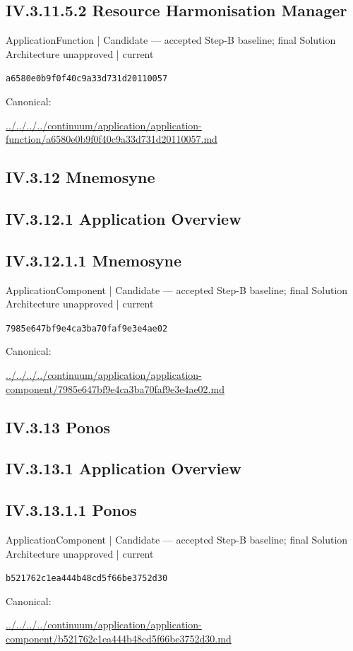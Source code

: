 \documentclass[10pt,a4paper]{article}
\begin{document}
\subsection*{IV.3.11.5.2 Resource Harmonisation Manager}
{\small ApplicationFunction | Candidate — accepted Step-B baseline; final Solution Architecture unapproved | current}\par
\texttt{a6580e0b9f0f40c9a33d731d20110057}\par
Canonical: \par
{\footnotesize\url{../../../../continuum/application/application-function/a6580e0b9f0f40c9a33d731d20110057.md}}\par
\subsection*{IV.3.12 Mnemosyne}
\subsection*{IV.3.12.1 Application Overview}
\subsection*{IV.3.12.1.1 Mnemosyne}
{\small ApplicationComponent | Candidate — accepted Step-B baseline; final Solution Architecture unapproved | current}\par
\texttt{7985e647bf9e4ca3ba70faf9e3e4ae02}\par
Canonical: \par
{\footnotesize\url{../../../../continuum/application/application-component/7985e647bf9e4ca3ba70faf9e3e4ae02.md}}\par
\subsection*{IV.3.13 Ponos}
\subsection*{IV.3.13.1 Application Overview}
\subsection*{IV.3.13.1.1 Ponos}
{\small ApplicationComponent | Candidate — accepted Step-B baseline; final Solution Architecture unapproved | current}\par
\texttt{b521762c1ea444b48cd5f66be3752d30}\par
Canonical: \par
{\footnotesize\url{../../../../continuum/application/application-component/b521762c1ea444b48cd5f66be3752d30.md}}\par
\end{document}
